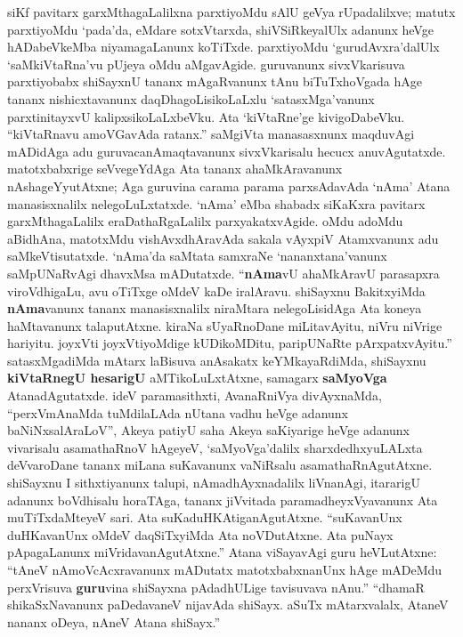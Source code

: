 siKf pavitarx garxMthagaLalilxna parxtiyoMdu sAlU geVya rUpadalilxve; matutx parxtiyoMdu `pada'da, eMdare sotxVtarxda, shiVSiRkeyalUlx adanunx heVge hADabeVkeMba niyamagaLanunx koTiTxde. parxtiyoMdu `gurudAvxra'dalUlx `saMkiVtaRna'vu pUjeya oMdu aMgavAgide. guruvanunx sivxVkarisuva parxtiyobabx shiSayxnU tananx mAgaRvanunx tAnu biTuTxhoVgada hAge tananx nishicxtavanunx daqDhagoLisikoLaLxlu `satasxMga'vanunx parxtinitayxvU kalipxsikoLaLxbeVku. Ata `kiVtaRne'ge kivigoDabeVku. ``kiVtaRnavu amoVGavAda ratanx.'' saMgiVta manasasxnunx maqduvAgi mADidAga adu guruvacanAmaqtavanunx sivxVkarisalu hecucx anuvAgutatxde. matotxbabxrige seVvegeYdAga Ata tananx ahaMkAravanunx nAshageYyutAtxne; Aga guruvina carama parama parxsAdavAda `nAma' Atana manasisxnalilx nelegoLuLxtatxde. `nAma' eMba shabadx siKaKxra pavitarx garxMthagaLalilx eraDathaRgaLalilx parxyakatxvAgide. oMdu adoMdu aBidhAna, matotxMdu vishAvxdhAravAda sakala vAyxpiV Atamxvanunx adu saMkeVtisutatxde. `nAma'da saMtata samxraNe `nananxtana'vanunx saMpUNaRvAgi dhavxMsa mADutatxde. ``{\bf nAma}vU ahaMkAravU parasapxra viroVdhigaLu, avu oTiTxge oMdeV kaDe iralAravu. shiSayxnu BakitxyiMda {\bf nAma}vanunx tananx manasisxnalilx niraMtara nelegoLisidAga Ata koneya haMtavanunx talaputAtxne. kiraNa sUyaRnoDane miLitavAyitu, niVru niVrige hariyitu. joyxVti joyxVtiyoMdige kUDikoMDitu, paripUNaRte pArxpatxvAyitu.'' satasxMgadiMda mAtarx laBisuva anAsakatx keYMkayaRdiMda, shiSayxnu {\bf kiVtaRnegU hesarigU} aMTikoLuLxtAtxne, samagarx {\bf saMyoVga} AtanadAgutatxde. ideV paramasithxti, AvanaRniVya divAyxnaMda, ``perxVmAnaMda tuMdilaLAda nUtana vadhu heVge adanunx baNiNxsalAraLoV'', Akeya patiyU saha Akeya saKiyarige heVge adanunx vivarisalu asamathaRnoV hAgeyeV, `saMyoVga'dalilx sharxdedhxyuLALxta deVvaroDane tananx miLana suKavanunx vaNiRsalu asamathaRnAgutAtxne. shiSayxnu I sithxtiyanunx talupi, nAmadhAyxnadalilx liVnanAgi, itararigU adanunx boVdhisalu horaTAga, tananx jiVvitada paramadheyxVyavanunx Ata muTiTxdaMteyeV sari. Ata suKaduHKAtiganAgutAtxne. ``suKavanUnx duHKavanUnx oMdeV daqSiTxyiMda Ata noVDutAtxne. Ata puNayx pApagaLanunx miVridavanAgutAtxne.'' Atana viSayavAgi guru heVLutAtxne: ``tAneV nAmoVcAcxravanunx mADutatx matotxbabxnanUnx hAge mADeMdu perxVrisuva {\bf guru}vina shiSayxna pAdadhULige tavisuvava nAnu.'' ``dhamaR shikaSxNavanunx paDedavaneV nijavAda shiSayx. aSuTx mAtarxvalalx, AtaneV nananx oDeya, nAneV Atana shiSayx.''

